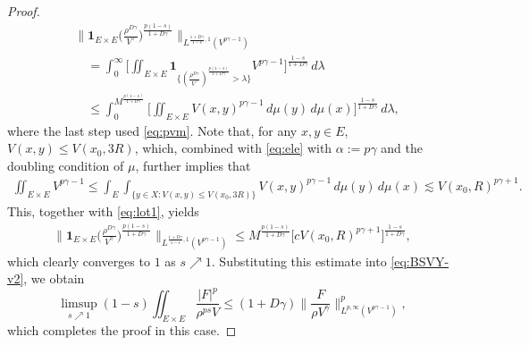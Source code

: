 \documentclass[11pt]{amsart}
\theoremstyle{definition}
\theoremstyle{remark}
\numberwithin{equation}{section}
\newcommand{\BNorm}[2]{\Big\|#1\Big\|_{#2}}
\begin{document}
\begin{proof}
\begin{equation}
\begin{split}
&\BNorm{\mathbf{1}_{E\times
E}\Big(\frac{\rho^{D\gamma}}{V^\gamma}\Big)^{\frac{p(1-s)}{1+D\gamma}}}{
L^{\frac{1+D\gamma}{1-s},1} (V^{p\gamma-1})}\\
&\quad=\int_{0}^{\infty}\Big[\iint_{E\times E}
\mathbf{1}_{\{(\frac{\rho^{D\gamma}}{V^\gamma})^{\frac{p(1-s)}{1+D\gamma}}>\lambda
\}}V^{p\gamma-1}\Big]^{\frac{1-s}{1+D\gamma}}\,d\lambda\\
&\quad\le \int_{0}^{M^{\frac{p(1-s)}{1+D\gamma}}}
\Big[\iint_{E\times
E}V(x,y)^{p\gamma-1}\,d\mu(y)\,d\mu(x)\Big]^{\frac{1-s}{1+D\gamma}}\,d\lambda,
\end{split}
\end{equation}
where the last step used \eqref{eq:pvm}.
Note that, for any $x,y\in E$, $V(x,y)\le V(x_0,3R)$,
which, combined with \eqref{eq:ele} with $\alpha:=p\gamma$ and the
doubling condition of $\mu$, further implies that
\begin{align*}
\iint_{E\times E}V^{p\gamma-1}\le
\int_E \int_{\{y\in X:V(x,y)\le V(x_0,3R)\}}V(x,y)^{p\gamma-1}\,d\mu(y)\,d\mu(x)
\lesssim V(x_0,R)^{p\gamma+1}.
\end{align*}
This, together with \eqref{eq:lot1}, yields
\begin{align*}
\BNorm{\mathbf{1}_{E\times
E}\Big(\frac{\rho^{D\gamma}}{V^\gamma}\Big)^{\frac{p(1-s)}{1+D\gamma}}}{
L^{\frac{1+D\gamma}{1-s},1} (V^{p\gamma-1})}\le
M^{\frac{p(1-s)}{1+D\gamma}}\Big[cV(x_0,R)^{p\gamma+1}\Big]^{\frac{1-s}{1+D\gamma}},
\end{align*}
which clearly converges to $1$ as $s\nearrow 1$.
Substituting this estimate into \eqref{eq:BSVY-v2}, we obtain
\begin{equation*}
  \limsup_{s\nearrow 1}(1-s)\iint_{E\times E}
     \frac{|F|^p}{\rho^{ps}V}
   \leq(1+D\gamma)\BNorm{\frac{F}{\rho V^\gamma}}{
L^{p,\infty} (V^{p\gamma-1})}^p,
\end{equation*}
which completes the proof in this case.


\end{proof}
\end{document}

